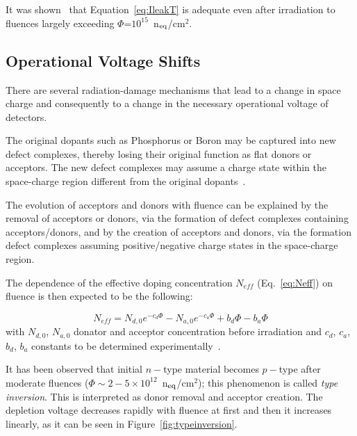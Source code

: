 It was shown~\cite{Chilingarov_tscale} that Equation~\ref{eq:IleakT} is adequate even after irradiation 
to fluences largely exceeding $\Phi$=$10^{15}$~n$_{\rm eq}$/cm$^2$.
 
\subsection{Operational Voltage Shifts}

There are several radiation-damage mechanisms that lead to a change in space charge and 
consequently to a change in the necessary operational voltage of detectors.

The original dopants such as Phosphorus or Boron may be captured into new defect complexes, 
thereby losing their original function as flat donors or acceptors. The new defect complexes may 
assume a charge state within the space-charge region different from the original 
dopants~\cite{Lutz:411172}.

The evolution of acceptors and donors with fluence can be explained by the removal of acceptors 
or donors, via the formation of defect complexes containing acceptors/donors, and by the 
creation of acceptors and donors, via the formation defect complexes assuming positive/negative 
charge states in the space-charge region.

The dependence of the effective doping concentration $N_{eff}$ (Eq.~\ref{eq:Neff}) on fluence is then 
expected to be the following:

\begin{equation}
N_{eff}=N_{d,0}e^{-c_d\Phi}-N_{a,0}e^{-c_a\Phi}+b_d\Phi-b_a\Phi
\label{eq:Neff_Fl}
\end{equation}
with $N_{d,0}$, $N_{a,0}$ donator and acceptor concentration before irradiation and $c_d$,
$c_a$, $b_d$, $b_a$ constants to be determined experimentally~\cite{Lutz:411172}.
 
 It has been observed that initial $n-$type material becomes $p-$type after moderate fluences 
 ($\Phi\sim2-5\times10^{12}$~n$_{\rm eq}$/cm$^2$); this phenomenon is called {\it type inversion}. 
 This is interpreted as donor removal and acceptor creation. The depletion voltage decreases rapidly 
 with fluence at 
 first and then it increases linearly, as it can be seen in Figure~\ref{fig:typeinversion}.
 
